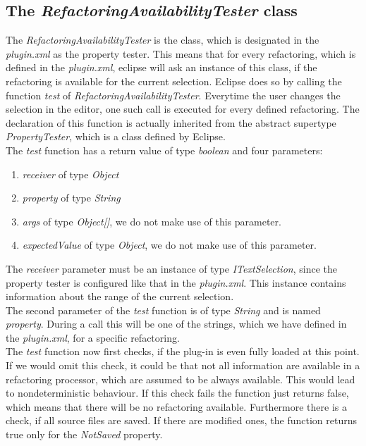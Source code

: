 \documentclass[a4paper,10pt]{report}
\begin{document}
\subsection{The {\it RefactoringAvailabilityTester} class}
The {\it RefactoringAvailabilityTester} is the class, which is designated in the {\it plugin.xml} as the property tester.
This means that for every refactoring, which is defined in the {\it plugin.xml}, eclipse will ask an instance of this class,
if the refactoring is available for the current selection.
Eclipse does so by calling the function {\it test} of {\it RefactoringAvailabilityTester}. 
Everytime the user changes the selection in the editor, one such call is executed for every defined refactoring.
The declaration of this function is actually inherited from the abstract supertype {\it PropertyTester}, which is a class defined by Eclipse.\\
The {\it test} function has a return value of type {\it boolean} and four parameters:
   \begin{enumerate}
     \item {\it receiver} of type {\it Object}
     \item {\it property} of type {\it String}
     \item {\it args}  of type {\it Object[]}, we do not make use of this parameter.
     \item {\it expectedValue}  of type {\it Object}, we do not make use of this parameter.
   \end{enumerate}
The {\it receiver} parameter must be an instance of type {\it ITextSelection}, since the property tester is configured like that in the {\it plugin.xml}.
This instance contains information about the range of the current selection.\\
The second parameter of the {\it test} function is of type {\it String} and is named {\it property}.
During a call this will be one of the strings, which we have defined in the {\it plugin.xml}, for a specific refactoring.\\
The {\it test} function now first checks, if the plug-in is even fully loaded at this point.
If we would omit this check, it could be that not all information are available in a refactoring processor, which are assumed to be always available.
This would lead to nondeterministic behaviour.
If this check fails the function just returns false, which means  that there will be no refactoring available.
Furthermore there is a check, if all source files are saved.
If there are modified ones, the function returns true only for the {\it NotSaved} property. 
\end{document}

